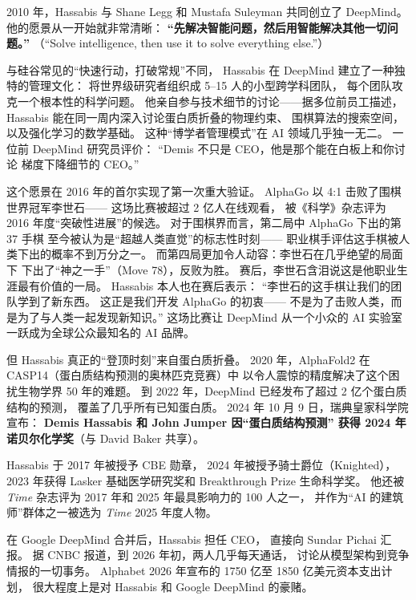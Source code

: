 2010 年，Hassabis 与 Shane Legg 和 Mustafa Suleyman 共同创立了 DeepMind。
他的愿景从一开始就非常清晰：
\textbf{``先解决智能问题，然后用智能解决其他一切问题。''}
（``Solve intelligence, then use it to solve everything else.''）

\begin{whybox}
与硅谷常见的``快速行动，打破常规''不同，
Hassabis 在 DeepMind 建立了一种独特的管理文化：
将世界级研究者组织成 5--15 人的小型跨学科团队，
每个团队攻克一个根本性的科学问题。
他亲自参与技术细节的讨论——据多位前员工描述，
Hassabis 能在同一周内深入讨论蛋白质折叠的物理约束、
围棋算法的搜索空间，以及强化学习的数学基础。
这种``博学者管理模式''在 AI 领域几乎独一无二。
一位前 DeepMind 研究员评价：
``Demis 不只是 CEO，他是那个能在白板上和你讨论
梯度下降细节的 CEO。''
\end{whybox}

这个愿景在 2016 年的首尔实现了第一次重大验证。
AlphaGo 以 4:1 击败了围棋世界冠军李世石——
这场比赛被超过 2 亿人在线观看，
被《科学》杂志评为 2016 年度``突破性进展''的候选。
对于围棋界而言，第二局中 AlphaGo 下出的第 37 手棋
至今被认为是``超越人类直觉''的标志性时刻——
职业棋手评估这手棋被人类下出的概率不到万分之一。
而第四局更加令人动容：李世石在几乎绝望的局面下
下出了``神之一手''（Move 78），反败为胜。
赛后，李世石含泪说这是他职业生涯最有价值的一局。
Hassabis 本人也在赛后表示：
``李世石的这手棋让我们的团队学到了新东西。
这正是我们开发 AlphaGo 的初衷——
不是为了击败人类，而是为了与人类一起发现新知识。''
这场比赛让 DeepMind 从一个小众的 AI 实验室
一跃成为全球公众最知名的 AI 品牌。

但 Hassabis 真正的``登顶时刻''来自蛋白质折叠。
2020 年，AlphaFold2 在 CASP14（蛋白质结构预测的奥林匹克竞赛）中
以令人震惊的精度解决了这个困扰生物学界 50 年的难题。
到 2022 年，DeepMind 已经发布了超过 2 亿个蛋白质结构的预测，
覆盖了几乎所有已知蛋白质。
2024 年 10 月 9 日，瑞典皇家科学院宣布：
\textbf{Demis Hassabis 和 John Jumper 因``蛋白质结构预测''
获得 2024 年诺贝尔化学奖}（与 David Baker 共享）。

Hassabis 于 2017 年被授予 CBE 勋章，
2024 年被授予骑士爵位（Knighted），
2023 年获得 Lasker 基础医学研究奖和 Breakthrough Prize 生命科学奖。
他还被 \textit{Time} 杂志评为 2017 年和 2025 年最具影响力的 100 人之一，
并作为``AI 的建筑师''群体之一被选为 \textit{Time} 2025 年度人物。

在 Google DeepMind 合并后，Hassabis 担任 CEO，
直接向 Sundar Pichai 汇报。
据 CNBC 报道，到 2026 年初，两人几乎每天通话，
讨论从模型架构到竞争情报的一切事务。
Alphabet 2026 年宣布的 1750 亿至 1850 亿美元资本支出计划，
很大程度上是对 Hassabis 和 Google DeepMind 的豪赌。


